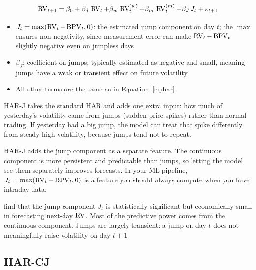 \begin{equation}
  \operatorname{RV}_{t+1} = \beta_0 + \beta_d \, \operatorname{RV}_{t} + \beta_w \, \operatorname{RV}^{(w)}_{t} + \beta_m \, \operatorname{RV}^{(m)}_{t} + \beta_J \, J_t + \varepsilon_{t+1}
  \label{eq:har-j}
\end{equation}
\begin{itemize}[nosep]
  \item $J_t = \max(\operatorname{RV}_t - \operatorname{BPV}_t, 0)$: the estimated jump component on day $t$; the $\max$ ensures non-negativity, since measurement error can make $\operatorname{RV}_t - \operatorname{BPV}_t$ slightly negative even on jumpless days
  \item $\beta_J$: coefficient on jumps; typically estimated as negative and small, meaning jumps have a weak or transient effect on future volatility
  \item All other terms are the same as in Equation~\eqref{eq:har}
\end{itemize}

\begin{intuition}
HAR-J takes the standard HAR and adds one extra input: how much of yesterday's volatility came from jumps (sudden price spikes) rather than normal trading.
If yesterday had a big jump, the model can treat that spike differently from steady high volatility, because jumps tend not to repeat.
\end{intuition}

\begin{projectconnection}
HAR-J adds the jump component as a separate feature.
The continuous component is more persistent and predictable than jumps, so letting the model see them separately improves forecasts.
In your ML pipeline, $J_t = \max(\operatorname{RV}_t - \operatorname{BPV}_t, 0)$ is a feature you should always compute when you have intraday data.
\end{projectconnection}

\begin{keyresult}
\citet{ABD2007} find that the jump component $J_t$ is statistically significant but economically small in forecasting next-day $\operatorname{RV}$.
Most of the predictive power comes from the continuous component.
Jumps are largely transient: a jump on day $t$ does not meaningfully raise volatility on day $t+1$.
\end{keyresult}

\subsection{HAR-CJ}

